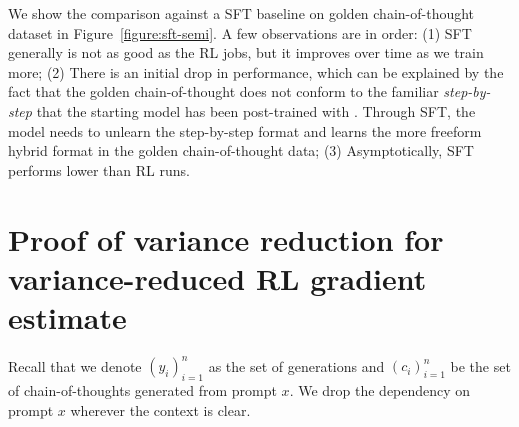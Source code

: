 \documentclass{article}
\theoremstyle{definition}
\begin{document}
\begin{appendix}
We show the comparison against a SFT baseline on golden chain-of-thought dataset in Figure~\ref{figure:sft-semi}. A few observations are in order: (1) SFT generally is not as good as the RL jobs, but it improves over time as we train more; (2) There is an initial drop in performance, which can be explained by the fact that the golden chain-of-thought does not conform to the familiar \emph{step-by-step} that the starting model has been post-trained with \citep{dubey2024llama}. Through SFT, the model needs to unlearn the step-by-step format and learns the more freeform hybrid format in the golden chain-of-thought data; (3) Asymptotically, SFT performs lower than RL runs.

\section{Proof of variance reduction for variance-reduced RL gradient estimate}\label{appendix:var}

Recall that we denote $(y_i)_{i=1}^n$ as the set of generations and $(c_i)_{i=1}^n$ be the set of  chain-of-thoughts generated from prompt $x$. We drop the dependency on prompt $x$
 wherever the context is clear. 
 

\end{appendix}
\end{document}
